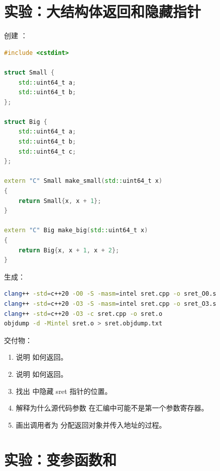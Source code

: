 \section{实验：大结构体返回和隐藏指针}

\begin{labbox}
创建 ：

\begin{lstlisting}[language=C++]
#include <cstdint>

struct Small {
    std::uint64_t a;
    std::uint64_t b;
};

struct Big {
    std::uint64_t a;
    std::uint64_t b;
    std::uint64_t c;
};

extern "C" Small make_small(std::uint64_t x)
{
    return Small{x, x + 1};
}

extern "C" Big make_big(std::uint64_t x)
{
    return Big{x, x + 1, x + 2};
}
\end{lstlisting}

生成：

\begin{lstlisting}[language=bash]
clang++ -std=c++20 -O0 -S -masm=intel sret.cpp -o sret_O0.s
clang++ -std=c++20 -O3 -S -masm=intel sret.cpp -o sret_O3.s
clang++ -std=c++20 -O3 -c sret.cpp -o sret.o
objdump -d -Mintel sret.o > sret.objdump.txt
\end{lstlisting}

交付物：

\begin{enumerate}
  \item 说明  如何返回。
  \item 说明  如何返回。
  \item 找出  中隐藏 sret 指针的位置。
  \item 解释为什么源代码参数  在汇编中可能不是第一个参数寄存器。
  \item 画出调用者为  分配返回对象并传入地址的过程。
\end{enumerate}
\end{labbox}

\section{实验：变参函数和 }

